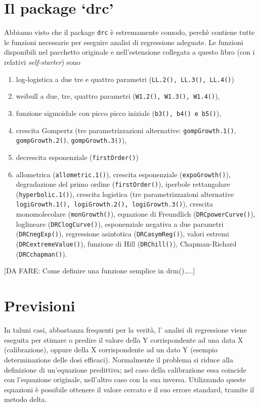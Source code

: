 \documentclass[a4paper,12pt,oneside]{book}
\providecommand{\tightlist}{%
  \setlength{\itemsep}{0pt}\setlength{\parskip}{0pt}}
\theoremstyle{definition}
\theoremstyle{definition}
\theoremstyle{definition}
\theoremstyle{remark}
\begin{document}
\section{\texorpdfstring{Il package
`drc'}{Il package drc}}\label{il-package-drc}

Abbiamo visto che il package \verb|drc| è estremamente comodo, perchè
contiene tutte le funzioni necessarie per eseguire analisi di
regressione adeguate. Le funzioni disponibili nel pacchetto originale e
nell'estensione collegata a questo libro (con i relativi
\emph{self-starter}) sono

\begin{enumerate}
\def\labelenumi{\arabic{enumi}.}
\tightlist
\item
  log-logistica a due tre e quattro parametri
  (\verb+LL.2(), LL.3(), LL.4()+)
\item
  weibull a due, tre, quattro parametri (\verb+W1.2(), W1.3(), W1.4()+),
\item
  funzione sigmoidale con picco picco iniziale
  (\verb+b3(), b4() e b5()+),
\item
  crescita Gompertz (tre parametrizzazioni alternative:
  \verb+gompGrowth.1()+, \verb+gompGrowth.2()+, \verb+gompGrowth.3()+),
\item
  decrescita esponenziale (\verb+firstOrder()+)
\item
  allometrica (\verb+allometric.1()+), crescita esponenziale
  (\verb+expoGrowth()+), degradazione del primo ordine
  (\verb+firstOrder()+), iperbole rettangolare (\verb+hyperbolic.1()+),
  crescita logistica (tre parametrizzazioni alternative
  \verb+logiGrowth.1(), logiGrowth.2(), logiGrowth.3()+), crescita
  monomolecolare (\verb+monGrowth()+), equazione di Freundlich
  (\verb+DRCpowerCurve()+), loglineare (\verb+DRClogCurve()+),
  esponenziale negativa a due parametri (\verb+DRCnegExp()+),
  regressione asintotica (\verb+DRCasymReg()+), valori estremi
  (\verb+DRCextremeValue()+), funzione di Hill (\verb+DRChill()+),
  Chapman-Richard (\verb+DRCchapman()+).
\end{enumerate}

{[}DA FARE: Come definire una funzione semplice in drm()\ldots{}..{]}

\section{Previsioni}\label{previsioni-1}

In taluni casi, abbastanza frequenti per la verità, l' analisi di
regressione viene eseguita per stimare o predire il valore della Y
corrispondente ad una data X (calibrazione), oppure della X
corrispondente ad un dato Y (esempio determinazione delle dosi
efficaci). Normalmente il problema si riduce alla definizione di
un'equazione predittiva; nel caso della calibrazione essa coincide con
l'equazione originale, nell'altro caso con la sua inversa. Utilizzando
queste equazioni è possibile ottenere il valore cercato e il suo errore
standard, tramite il metodo delta.
\end{document}
